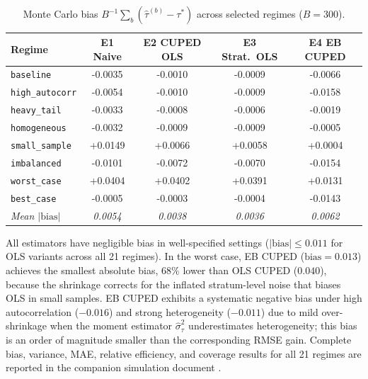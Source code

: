 \documentclass[12pt]{article}
\theoremstyle{plain}
\theoremstyle{definition}
\begin{document}
\begin{table}[htbp]
\centering
\caption{Monte Carlo bias $B^{-1}\sum_b(\hat{\tau}^{(b)} - \tau^*)$ across
         selected regimes ($B = 300$).}
\label{tab:bias_summary}
\small
\begin{tabular}{l
  S[table-format=+1.4]
  S[table-format=+1.4]
  S[table-format=+1.4]
  S[table-format=+1.4]}
\toprule
\textbf{Regime}
  & {\textbf{E1 Naive}}
  & {\textbf{E2 CUPED OLS}}
  & {\textbf{E3 Strat.\ OLS}}
  & {\textbf{E4 EB CUPED}} \\
\midrule
\texttt{baseline}          & -0.0035 & -0.0010 & -0.0009 & -0.0066 \\
\texttt{high\_autocorr}    & -0.0054 & -0.0010 & -0.0009 & -0.0158 \\
\texttt{heavy\_tail}       & -0.0033 & -0.0008 & -0.0006 & -0.0019 \\
\texttt{homogeneous}       & -0.0032 & -0.0009 & -0.0009 & -0.0005 \\
\texttt{small\_sample}     & +0.0149 & +0.0066 & +0.0058 & +0.0004 \\
\texttt{imbalanced}        & -0.0101 & -0.0072 & -0.0070 & -0.0154 \\
\texttt{worst\_case}       & +0.0404 & +0.0402 & +0.0391 & +0.0131 \\
\texttt{best\_case}        & -0.0005 & -0.0003 & -0.0004 & -0.0143 \\
\midrule
\textit{Mean $|\text{bias}|$}
  & \textit{0.0054} & \textit{0.0038} & \textit{0.0036} & \textit{0.0062} \\
\bottomrule
\end{tabular}
\end{table}

All estimators have negligible bias in well-specified settings
($|\text{bias}| \le 0.011$ for OLS variants across all 21 regimes).
In the worst case, EB CUPED ($\text{bias} = 0.013$) achieves the smallest
absolute bias, $68\%$ lower than OLS CUPED ($0.040$), because the
shrinkage corrects for the inflated stratum-level noise that biases OLS
in small samples.
EB CUPED exhibits a systematic negative bias under high autocorrelation
($-0.016$) and strong heterogeneity ($-0.011$) due to mild over-shrinkage
when the moment estimator $\hat{\sigma}_\tau^2$ underestimates heterogeneity;
this bias is an order of magnitude smaller than the corresponding RMSE gain.
Complete bias, variance, MAE, relative efficiency, and coverage results for
all 21 regimes are reported in the companion simulation document
\citep{farahat2026sim}.
\end{document}
